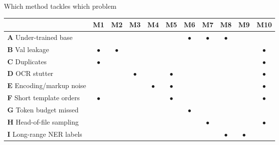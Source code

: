 \documentclass[aspectratio=169,11pt]{beamer}
\newcommand{\pb}[1]{\textbf{\textcolor{warm}{#1}}}   %
\newcommand{\mt}[1]{\textbf{\textcolor{aqua!80!black}{#1}}} %
\newcommand{\yes}{\textcolor{aqua!80!black}{$\bullet$}}
\begin{document}
\begin{frame}{Which method tackles which problem}
  \centering
  \small
  \begin{tabular}{l*{10}{c}}
    \toprule
    & \mt{M1} & \mt{M2} & \mt{M3} & \mt{M4} & \mt{M5} & \mt{M6} & \mt{M7} & \mt{M8} & \mt{M9} & \mt{M10} \\
    \midrule
    \pb{A} Under-trained base     &      &      &      &      &      & \yes & \yes & \yes &      &      \\
    \pb{B} Val leakage            & \yes & \yes &      &      &      &      &      &      &      & \yes \\
    \pb{C} Duplicates             & \yes &      &      &      &      &      &      &      &      & \yes \\
    \pb{D} OCR stutter            &      &      & \yes &      & \yes &      &      &      &      & \yes \\
    \pb{E} Encoding/markup noise  &      &      &      & \yes & \yes &      &      &      &      & \yes \\
    \pb{F} Short template orders  & \yes &      &      &      & \yes &      &      &      &      & \yes \\
    \pb{G} Token budget missed    &      &      &      &      &      & \yes &      &      &      &      \\
    \pb{H} Head-of-file sampling  &      &      &      &      &      &      & \yes &      &      & \yes \\
    \pb{I} Long-range NER labels  &      &      &      &      &      &      &      & \yes & \yes &      \\
    \bottomrule
  \end{tabular}
\end{frame}
\end{document}

